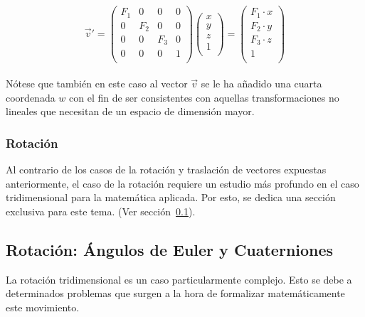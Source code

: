 \begin{equation}
	\label{eq:matrixscaling}
	\overrightarrow{v}' = 
	\left( \begin{array}{cccc}
			F_1 & 0   & 0   & 0	\\
			0   & F_2 & 0   & 0	\\
			0   & 0   & F_3 & 0	\\
			0   & 0   & 0   & 1	\\
	\end{array} \right)
	\left( \begin{array}{c}
			x \\
			y \\
			z \\
			1 \\
	\end{array} \right) =
	\left( \begin{array}{c}
			F_1\cdot x \\
			F_2\cdot y \\
			F_3\cdot z \\
			1 \\
	\end{array} \right)
\end{equation}\\

Nótese que también en este caso al vector $\overrightarrow{v}$ se le ha añadido
una cuarta coordenada $w$ con el fin de ser consistentes con aquellas
transformaciones no lineales que necesitan de un espacio de dimensión mayor. \\

\subsubsection{Rotación}
\label{makereference5.4.1.3}

Al contrario de los casos de la rotación y traslación de vectores expuestas
anteriormente, el caso de la rotación requiere un estudio más profundo en el
caso tridimensional para la matemática aplicada. Por esto, se dedica una sección
exclusiva para este tema. (Ver sección~\ref{makereference5.4.2}).

\subsection{Rotación: Ángulos de Euler y Cuaterniones}
\label{makereference5.4.2}

La rotación tridimensional es un caso particularmente complejo. Esto se debe a
determinados problemas que surgen a la hora de formalizar matemáticamente este
movimiento. \\


